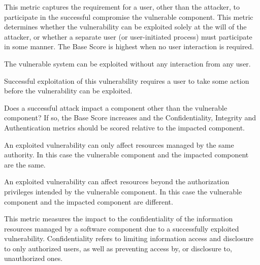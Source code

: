 \begin{description}[itemsep=1em,align=left]
\begin{description}[noitemsep,align=left]
            \end{description}
        \item [User Interaction:] This metric captures the requirement for a user, other than the attacker, to participate in the successful compromise the vulnerable component. 
            This metric determines whether the vulnerability can be exploited solely at the will of the attacker, or whether a separate user (or user-initiated process) must participate in some manner. 
            The Base Score is highest when no user interaction is required.
            \begin{description}[noitemsep,align=left]
                \item [None:] The vulnerable system can be exploited without any interaction from any user.
                \item [Required:] Successful exploitation of this vulnerability requires a user to take some action before the vulnerability can be exploited.
            \end{description}
        \item [Scope:] Does a successful attack impact a component other than the vulnerable component? 
            If so, the Base Score increases and the Confidentiality, Integrity and Authentication metrics should be scored relative to the impacted component.
            \begin{description}[noitemsep,align=left]
                \item [Unchanged:] An exploited vulnerability can only affect resources managed by the same authority. 
                    In this case the vulnerable component and the impacted component are the same.
                \item [Changed:] An exploited vulnerability can affect resources beyond the authorization privileges intended by the vulnerable component. 
                    In this case the vulnerable component and the impacted component are different.
            \end{description}
        \item [Confidentiality:] This metric measures the impact to the confidentiality of the information resources managed by a software component due to a successfully exploited vulnerability.
            Confidentiality refers to limiting information access and disclosure to only authorized users, as well as preventing access by, or disclosure to, unauthorized ones.
            \begin{description}[noitemsep,align=left]

\end{description}
\end{description}
